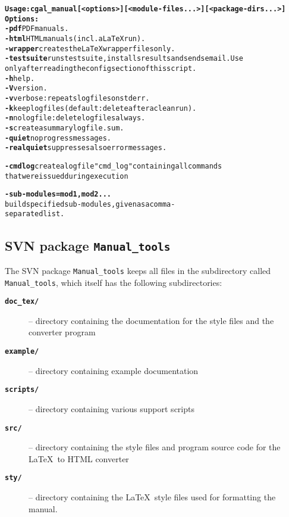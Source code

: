 \begin{alltt}
\textbf{Usage: cgal\_manual [<options>] [<module-files...>] [<package-dirs...>]}
\textbf{Options:}
    \textbf{-pdf      }          PDF manuals.
    \textbf{-html     }          HTML manuals (incl. a LaTeX run).
    \textbf{-wrapper  }          creates the LaTeX wrapper files only.
    \textbf{-testsuite}          runs testsuite, installs results and sends email. Use
    \textbf{          }          only after reading the config section of this script.
    \textbf{-h        }          help.
    \textbf{-V        }          version.
    \textbf{-v        }          verbose: repeats logfiles on stderr.
    \textbf{-k        }          keep logfiles (default: delete after a clean run).
    \textbf{-n        }          no logfile: delete logfiles always.
    \textbf{-s        }          create a summary logfile .sum .
    \textbf{-quiet    }          no progress messages.
    \textbf{-realquiet}          suppresses also error messages.

    \textbf{-cmdlog   }          create a logfile "cmd_log" containing all commands
                          that were issued during execution

    \textbf{-sub-modules=mod1,mod2...}
                          build specified sub-modules, given as a comma-
                          separated list.
\end{alltt}


\subsection{SVN package \texttt{Manual\_tools}}

The SVN package \texttt{Manual\_tools} keeps all files in the
subdirectory called \texttt{Manual\_tools}, which itself has
the following subdirectories:

\begin{description}
   \item[{\bf\tt doc\_tex/}] -- directory containing the documentation for
        the style files and the converter program
   \item[{\bf\tt example/}] -- directory containing example documentation
   \item[{\bf\tt scripts/}] -- directory containing various support scripts
   \item[{\bf\tt src/}] -- directory containing the style files and program
        source code for the \LaTeX\ to HTML converter
   \item[{\bf\tt sty/}] -- directory containing the \LaTeX\ style files
        used for formatting the manual.
\end{description}

